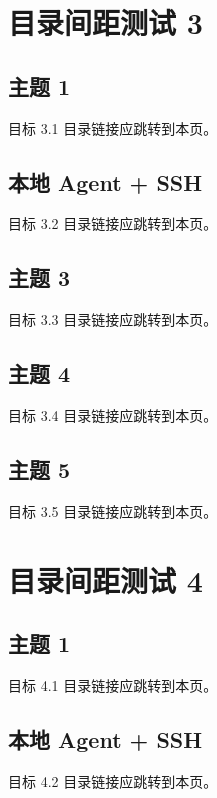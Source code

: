 \documentclass[navigation=false]{campusbeamer}
\begin{document}
\section{目录间距测试 3}
\sectioncoverpage[primary]{}
\subsection{主题 1}
\begin{frame}{目标 3.1}
目录链接应跳转到本页。
\end{frame}
\subsection{本地 Agent + SSH}
\begin{frame}{目标 3.2}
目录链接应跳转到本页。
\end{frame}
\subsection{主题 3}
\begin{frame}{目标 3.3}
目录链接应跳转到本页。
\end{frame}
\subsection{主题 4}
\begin{frame}{目标 3.4}
目录链接应跳转到本页。
\end{frame}
\subsection{主题 5}
\begin{frame}{目标 3.5}
目录链接应跳转到本页。
\end{frame}
\section{目录间距测试 4}
\sectioncoverpage[primary]{}
\subsection{主题 1}
\begin{frame}{目标 4.1}
目录链接应跳转到本页。
\end{frame}
\subsection{本地 Agent + SSH}
\begin{frame}{目标 4.2}
目录链接应跳转到本页。
\end{frame}
\end{document}
